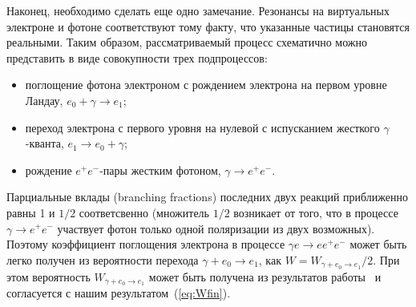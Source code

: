 Наконец, необходимо сделать еще одно замечание.  Резонансы 
на виртуальных электроне и 
фотоне соответствуют тому факту, что указанные частицы становятся 
реальными. Таким образом,  
рассматриваемый процесс схематично можно представить в виде совокупности трех 
подпроцессов: 
\begin{itemize}
\item
поглощение фотона электроном с рождением электрона на первом уровне Ландау, $e_0+\gamma \to e_1$; 

\item
переход электрона с первого уровня на нулевой с испусканием жесткого $\gamma$-кванта, 
$e_1 \to e_0 + \gamma$;

\item
рождение $e^+e^-$-пары жестким фотоном, $\gamma \to e^+e^-$.

\end{itemize}

Парциальные вклады (branching fractions) последних двух 
реакций приближенно равны 1 и $1/2$ соответсвенно 
(множитель $1/2$ возникает от того, 
что в процессе $\gamma \to e^+e^-$ участвует фотон только одной поляризации из двух возможных). 
Поэтому коэффициент поглощения электрона в  процессе  
$\gamma e \to e e^+e^-$ может быть легко получен из 
вероятности перехода $\gamma + e_0  \to e_1$, как $W = W_{\gamma + e_0 \to e_1}/2$. 
При этом вероятность $W_{\gamma + e_0 \to e_1}$ может быть получена из результатов 
работы~\cite{Latal:86} и согласуется с нашим результатом~(\ref{eq:Wfin}).
 
 